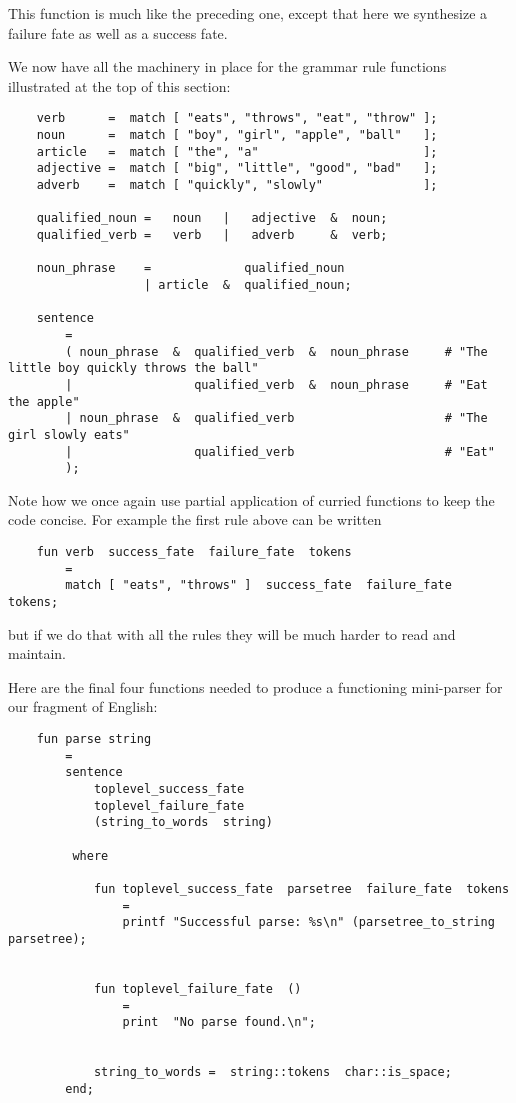This function is much like the preceding one, except that here 
we synthesize a failure fate as well as a success fate.

We now have all the machinery in place for the grammar rule 
functions illustrated at the top of this section:

\begin{verbatim}
    verb      =  match [ "eats", "throws", "eat", "throw" ];
    noun      =  match [ "boy", "girl", "apple", "ball"   ];
    article   =  match [ "the", "a"                       ];
    adjective =  match [ "big", "little", "good", "bad"   ];
    adverb    =  match [ "quickly", "slowly"              ];

    qualified_noun =   noun   |   adjective  &  noun;
    qualified_verb =   verb   |   adverb     &  verb;

    noun_phrase    =             qualified_noun
                   | article  &  qualified_noun;

    sentence
        =
        ( noun_phrase  &  qualified_verb  &  noun_phrase     # "The little boy quickly throws the ball"
        |                 qualified_verb  &  noun_phrase     # "Eat the apple"
        | noun_phrase  &  qualified_verb                     # "The girl slowly eats"
        |                 qualified_verb                     # "Eat"
        );
\end{verbatim}

Note how we once again use partial application of curried functions 
to keep the code concise.  For example the first rule above can 
be written

\begin{verbatim}
    fun verb  success_fate  failure_fate  tokens
        =
        match [ "eats", "throws" ]  success_fate  failure_fate  tokens;
\end{verbatim}

but if we do that with all the rules they will be much 
harder to read and maintain.

Here are the final four functions needed to produce a functioning 
mini-parser for our fragment of English:

\begin{verbatim}
    fun parse string
        =
        sentence
            toplevel_success_fate
            toplevel_failure_fate
            (string_to_words  string)

         where

            fun toplevel_success_fate  parsetree  failure_fate  tokens
                =
                printf "Successful parse: %s\n" (parsetree_to_string  parsetree);


            fun toplevel_failure_fate  ()
                =
                print  "No parse found.\n";


            string_to_words =  string::tokens  char::is_space;
        end;
\end{verbatim}

